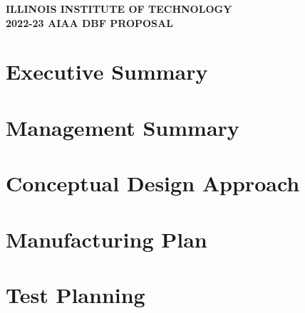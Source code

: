 \documentclass[proposal]{aiaa}
\begin{document}
\large
\begin{center}
\textbf{{ILLINOIS INSTITUTE OF TECHNOLOGY}}\\
\textbf{2022-23 AIAA DBF PROPOSAL}
\end{center}
%
\section{Executive Summary}\label{s:es}
    
\section{Management Summary}\label{s:ms}
    
\section{Conceptual Design Approach}\label{s:cda}
    
\section{Manufacturing Plan}\label{s:mp}
    
\section{Test Planning}\label{s:tp}
    
\end{document}
